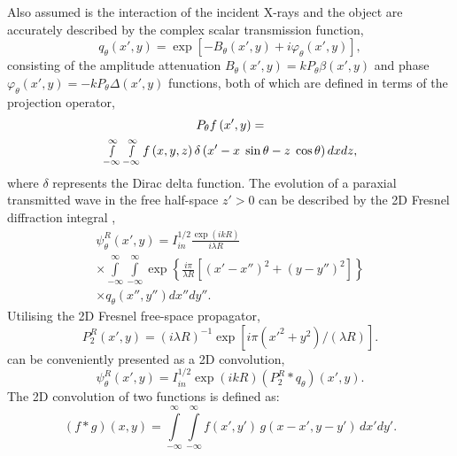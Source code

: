 \documentclass[twocolumn, switch]{article} %
\begin{document}
Also assumed is the interaction of the incident X-rays and the object are accurately described by the complex scalar transmission function, 
\begin{equation}
    \label{eq3:complex_scalar_transmission}
    {q_\theta }\left( {x',y} \right) = \exp\left[ { - {B_\theta }(x',y) + i{\varphi _\theta }(x',y)} \right],
\end{equation}
consisting of the amplitude attenuation ${B_\theta }(x',y) = k{P_\theta }\beta \left( {x',y} \right)$ and phase ${\varphi _\theta }(x',y) =  - k{P_\theta }\Delta \left( {x',y} \right)$ functions, both of which are defined in terms of the projection operator, 
\begin{multline}
    \label{eq3:projection_operator}
    {P_\theta }f\left( {x',y} \right) = \\
    \mathop \smallint \limits_{ - \infty }^\infty  \mathop \smallint \limits_{ - \infty }^\infty  f\left( {x,y,z} \right)\delta \left( {x' - x\;\sin \theta  - z\;\cos \theta } \right)dxdz,
\end{multline}
where $\delta$ represents the Dirac delta function. 
The evolution of a paraxial transmitted wave in the free half-space $z' > 0$ can be described by the 2D Fresnel diffraction integral \cite{Goodman1996IntroductionOptics},
\begin{multline}
    \label{eq3:paraxial_wave}
    \psi _\theta ^R(x',y) = I_{in}^{1/2}\frac{{\exp \left( {ikR} \right)}}{{i\lambda R}}\\
    \times \int\limits_{ - \infty }^\infty  {\int\limits_{ - \infty }^\infty  {\exp \left\{ {\frac{{i\pi }}{{\lambda R}}\left[ {{{\left( {x' - x''} \right)}^2} + {{(y - y'')}^2}} \right]} \right\}}}\\
    \times {q_\theta }\left( {x'',y''} \right)dx''dy''.
\end{multline}
Utilising the 2D Fresnel free-space propagator,
\begin{equation}
    \label{eq3:fresnel_propagator_2d}
     P_2^R\left( {x',y} \right) = {\left( {i\lambda R} \right)^{ - 1}}\exp \left[ {i\pi \left( {{{x'}^2} + {y^2}} \right)/(\lambda R)} \right].
\end{equation}
 can be conveniently presented as a 2D convolution, 
\begin{equation}
    \label{eq3:paraxial_wave_conv}
    \psi _\theta ^R(x',y) = I_{in}^{1/2} \exp (ikR)\left({P_2^R * {q_\theta }}\right)(x',y).       
\end{equation}
The 2D convolution of two functions is defined as:
\begin{equation}
    \label{eq3:convolution_2d}
    (f * g)\left( {x,y} \right) = \int\limits_{ - \infty }^\infty  {\int\limits_{ - \infty }^\infty  {f(x',y')\,g(x - x',y - y')\,dx'dy'} } .
\end{equation}
\end{document}
